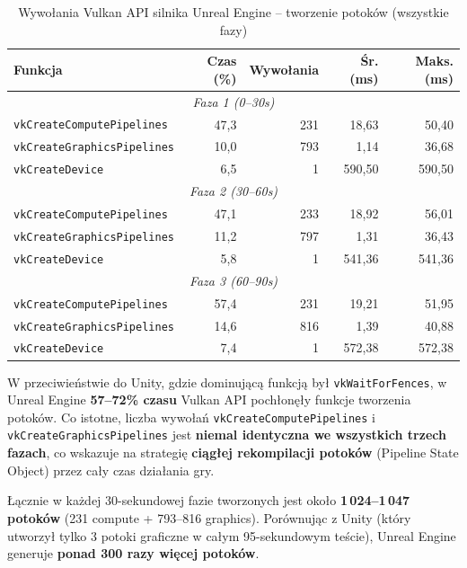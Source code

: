 \begin{table}[H]
\centering
\caption{Wywołania Vulkan API silnika Unreal Engine -- tworzenie potoków (wszystkie fazy)}
\label{tab:unreal-vulkan-pipelines}
\small
\begin{tabular}{|l|r|r|r|r|}
\hline
\textbf{Funkcja} & \textbf{Czas (\%)} & \textbf{Wywołania} & \textbf{Śr. (ms)} & \textbf{Maks. (ms)} \\
\hline
\multicolumn{5}{|c|}{\textit{Faza 1 (0--30s)}} \\
\hline
\texttt{vkCreateComputePipelines} & 47,3 & 231 & 18,63 & 50,40 \\
\texttt{vkCreateGraphicsPipelines} & 10,0 & 793 & 1,14 & 36,68 \\
\texttt{vkCreateDevice} & 6,5 & 1 & 590,50 & 590,50 \\
\hline
\multicolumn{5}{|c|}{\textit{Faza 2 (30--60s)}} \\
\hline
\texttt{vkCreateComputePipelines} & 47,1 & 233 & 18,92 & 56,01 \\
\texttt{vkCreateGraphicsPipelines} & 11,2 & 797 & 1,31 & 36,43 \\
\texttt{vkCreateDevice} & 5,8 & 1 & 541,36 & 541,36 \\
\hline
\multicolumn{5}{|c|}{\textit{Faza 3 (60--90s)}} \\
\hline
\texttt{vkCreateComputePipelines} & 57,4 & 231 & 19,21 & 51,95 \\
\texttt{vkCreateGraphicsPipelines} & 14,6 & 816 & 1,39 & 40,88 \\
\texttt{vkCreateDevice} & 7,4 & 1 & 572,38 & 572,38 \\
\hline
\end{tabular}
\end{table}

W przeciwieństwie do Unity, gdzie dominującą funkcją był \texttt{vkWaitForFences}, 
w Unreal Engine \textbf{57--72\% czasu} Vulkan API 
pochłonęły funkcje tworzenia potoków. 
Co istotne, liczba wywołań \texttt{vkCreateComputePipelines} i 
\texttt{vkCreateGraphicsPipelines} jest 
\textbf{niemal identyczna we wszystkich trzech fazach}, co wskazuje na strategię \textbf{ciągłej rekompilacji potoków} (Pipeline State Object) 
przez cały czas działania gry.

Łącznie w każdej 30-sekundowej fazie tworzonych jest około \textbf{1\,024--1\,047 potoków} (231 compute + 793--816 graphics). Porównując z Unity 
(który utworzył tylko 3 potoki graficzne w całym 95-sekundowym teście), Unreal Engine generuje \textbf{ponad 300 razy więcej potoków}.

